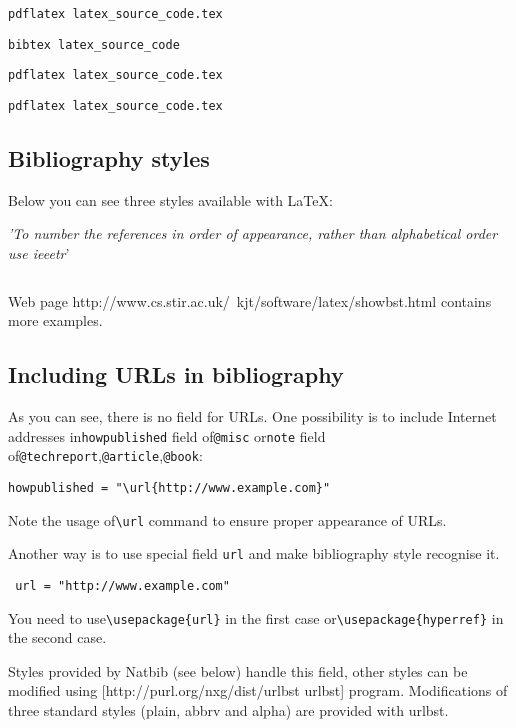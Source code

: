 \verb|pdflatex latex_source_code.tex|

\verb|bibtex latex_source_code|

\verb|pdflatex latex_source_code.tex|

\verb|pdflatex latex_source_code.tex|

\subsection{Bibliography styles}
Below you can see three styles available with LaTeX: %

\textit{'To number the references in order of appearance, rather than alphabetical order use ieeetr}'

\begin{lstlisting}

\end{lstlisting}

Web page http://www.cs.stir.ac.uk/~kjt/software/latex/showbst.html contains more examples.

\subsection{Including URLs in bibliography}
As you can see, there is no field for URLs. One possibility is to include
Internet addresses in\verb|howpublished| field of\verb|@misc| or\verb|note|
field of\verb|@techreport|,\verb|@article|,\verb|@book|:
\begin{lstlisting}
howpublished = "\url{http://www.example.com}"
\end{lstlisting}
Note the usage of\verb|\url| command to ensure proper appearance of URLs.

Another way is to use special field \verb|url| and make bibliography style recognise it.

\begin{lstlisting}
 url = "http://www.example.com"
\end{lstlisting}
You need to use\verb|\usepackage{url}| in the first case or\verb|\usepackage{hyperref}| in the second case.

Styles provided by Natbib (see below) handle this field, other styles can be
modified using [http://purl.org/nxg/dist/urlbst urlbst] program. Modifications
of three standard styles (plain, abbrv and alpha) are provided with urlbst.

